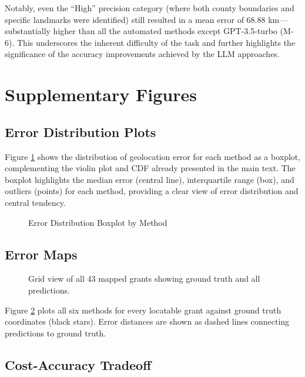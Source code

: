 Notably, even the ``High'' precision category (where both county
boundaries and specific landmarks were identified) still resulted in a
mean error of 68.88 km---substantially higher than all the automated
methods except GPT-3.5-turbo (M-6). This underscores the inherent
difficulty of the task and further highlights the significance of the
accuracy improvements achieved by the LLM approaches.

\section{Supplementary
Figures}\label{appendix-c-supplementary-figures}

\subsection{Error Distribution
Plots}\label{c.1-error-distribution-plots}

Figure \ref{fig:error_boxplot} shows the distribution of geolocation
error for each method as a boxplot, complementing the violin plot and
CDF already presented in the main text. The boxplot highlights the
median error (central line), interquartile range (box), and outliers
(points) for each method, providing a clear view of error distribution
and central tendency.

\begin{figure}
\centering
{}
\caption{Error Distribution Boxplot by Method}\label{fig:error_boxplot}
\end{figure}

\subsection{Error Maps}\label{c.2-error-maps}

\begin{figure}
\centering
{}
\caption{Grid view of all 43 mapped grants showing ground truth and all
predictions.}\label{fig:contactsheet}
\end{figure}

Figure \ref{fig:contactsheet} plots all six methods for every locatable
grant against ground truth coordinates (black stars). Error distances
are shown as dashed lines connecting predictions to ground truth.

\subsection{Cost-Accuracy
Tradeoff}\label{c.3-cost-accuracy-tradeoff}


